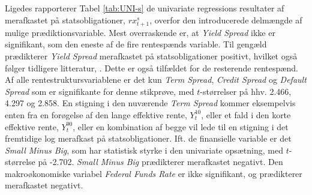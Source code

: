 \documentclass[
  a4paper,
  oneside]{memoir}
\begin{document}
Ligedes rapporterer Tabel \ref{tab:UNI-s} de univariate regressions resultater af merafkastet på statsobligationer, \(rx_{t+1}^s\), overfor den introducerede delmængde af mulige prædiktionsvariable. Mest overraskende er, at \emph{Yield Spread} ikke er signifikant, som den eneste af de fire rentespænds variable. Til gengæld prædikterer \emph{Yield Spread} merafkastet på statsobligationer positivt, hvilket også følger tidligere litteratur, \citep{Fama1987}. Dette er også tilfældet for de resterende rentespænd. Af alle rentestruktursvariablene er det kun \emph{Term Spread}, \emph{Credit Spread} og \emph{Default Spread} som er signifikante for denne stikprøve, med \(t\)-størrelser på hhv. 2.466, 4.297 og 2.858. En stigning i den nuværende \emph{Term Spread} kommer eksempelvis enten fra en forøgelse af den lange effektive rente, \(Y_t^{10}\), eller et fald i den korte effektive rente, \(Y_t^90\), eller en kombination af begge vil lede til en stigning i det fremtidige log merafkast på statsobligationer. Ift. de finansielle variable er det \emph{Small Minus Big}, som har statistisk styrke i den univariate opsætning, med \(t\)-størrelse på -2.702. \emph{Small Minus Big} prædikterer merafkastet negativt. Den makroøkonomiske variabel \emph{Federal Funds Rate} er ikke signifikant, og prædikterer merafkastet negativt.
\end{document}
